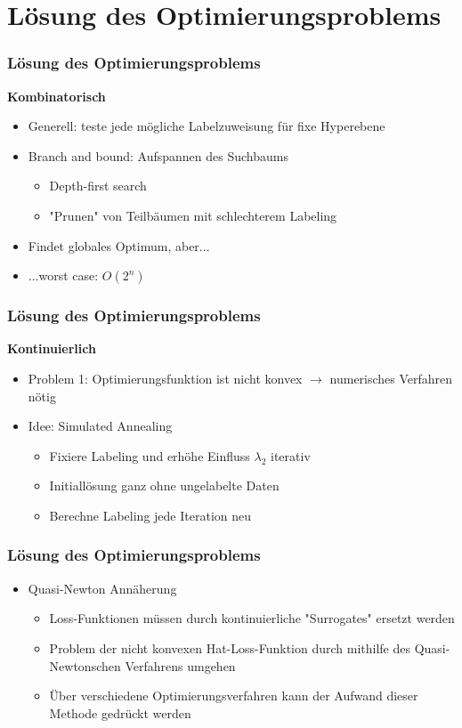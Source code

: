 \documentclass{beamer}
\begin{document}
\section{L\"osung des Optimierungsproblems}

\begin{frame}
    \frametitle{L\"osung des Optimierungsproblems}
    \textbf{Kombinatorisch}
    \begin{itemize}
        \item Generell: teste jede mögliche Labelzuweisung f\"ur fixe Hyperebene
        \item Branch and bound: Aufspannen des Suchbaums
        \begin{itemize}
        	\item Depth-first search
        	\item "Prunen" von Teilb\"aumen mit schlechterem Labeling
        \end{itemize}
        \item Findet globales Optimum, aber...
        \item ...worst case: $O(2^n)$
    \end{itemize}
\end{frame}

\begin{frame}
	\frametitle{L\"osung des Optimierungsproblems}
	\textbf{Kontinuierlich}
	\begin{itemize}
		\item Problem 1: Optimierungsfunktion ist nicht konvex $\rightarrow$ numerisches Verfahren n\"otig
		\item Idee: Simulated Annealing
		\begin{itemize}
			\item Fixiere Labeling und erh\"ohe Einfluss $\lambda_2$ iterativ
			\item Initiall\"osung ganz ohne ungelabelte Daten
			\item Berechne Labeling jede Iteration neu
		\end{itemize}
	\end{itemize}
\end{frame}

\begin{frame}
    \frametitle{L\"osung des Optimierungsproblems}
    \begin{itemize}
        \item Quasi-Newton Ann\"aherung
        \begin{itemize}
            \item Loss-Funktionen m\"ussen durch kontinuierliche "Surrogates" ersetzt werden
            \item Problem der nicht konvexen Hat-Loss-Funktion durch mithilfe des Quasi-Newtonschen Verfahrens umgehen
            \item \"Uber verschiedene Optimierungsverfahren kann der Aufwand dieser Methode gedr\"uckt werden
        \end{itemize}
    \end{itemize}
\end{frame}
\end{document}
